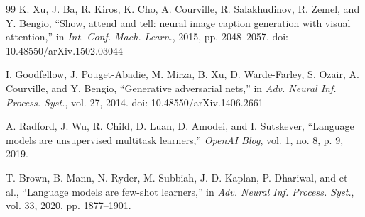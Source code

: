 \documentclass[preprint,12pt]{elsarticle}
\begin{document}
\begin{thebibliography}{99}
 K. Xu, J. Ba, R. Kiros, K. Cho, A. Courville, R. Salakhudinov, R. Zemel, and Y. Bengio, ``Show, attend and tell: neural image caption generation with visual attention,'' in \textit{Int. Conf. Mach. Learn.}, 2015, pp. 2048--2057. doi: 10.48550/arXiv.1502.03044

 I. Goodfellow, J. Pouget-Abadie, M. Mirza, B. Xu, D. Warde-Farley, S. Ozair, A. Courville, and Y. Bengio, ``Generative adversarial nets,'' in \textit{Adv. Neural Inf. Process. Syst.}, vol. 27, 2014. doi: 10.48550/arXiv.1406.2661

 A. Radford, J. Wu, R. Child, D. Luan, D. Amodei, and I. Sutskever, ``Language models are unsupervised multitask learners,'' \textit{OpenAI Blog}, vol. 1, no. 8, p. 9, 2019.

 T. Brown, B. Mann, N. Ryder, M. Subbiah, J. D. Kaplan, P. Dhariwal, and et al., ``Language models are few-shot learners,'' in \textit{Adv. Neural Inf. Process. Syst.}, vol. 33, 2020, pp. 1877--1901.

\end{thebibliography}
\end{document}
